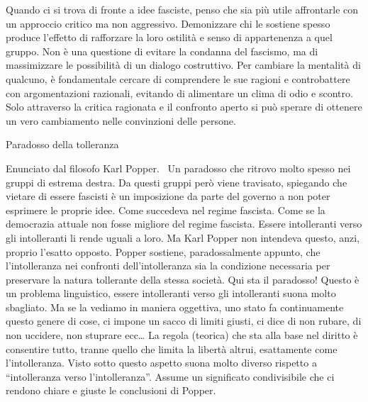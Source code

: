 \documentclass[12pt]{book} %
\begin{document}
\begin{mdframed}[linewidth=1pt]
Quando ci si trova di fronte a idee fasciste, penso che sia più utile affrontarle con un approccio critico ma non aggressivo. Demonizzare chi le sostiene spesso produce l'effetto di rafforzare la loro ostilità e senso di appartenenza a quel gruppo. Non è una questione di evitare la condanna del fascismo, ma di massimizzare le possibilità di un dialogo costruttivo. Per cambiare la mentalità di qualcuno, è fondamentale cercare di comprendere le sue ragioni e controbattere con argomentazioni razionali, evitando di alimentare un clima di odio e scontro. Solo attraverso la critica ragionata e il confronto aperto si può sperare di ottenere un vero cambiamento nelle convinzioni delle persone.
\end{mdframed}

\bigskip
\begin{mdframed}[linewidth=1pt]
Paradosso della tolleranza

Enunciato dal filosofo Karl Popper. \ Un paradosso che ritrovo molto spesso nei gruppi di estrema destra. Da questi
gruppi però viene travisato, spiegando che vietare di essere fascisti è un imposizione da parte del governo a non poter
esprimere le proprie idee. Come succedeva nel regime fascista. Come se la democrazia attuale non fosse migliore del
regime fascista. Essere intolleranti verso gli intolleranti li rende uguali a loro. Ma Karl Popper non intendeva
questo, anzi, proprio l'esatto opposto. Popper sostiene, paradossalmente appunto, che
l'intolleranza nei confronti dell'intolleranza sia la condizione necessaria per preservare la natura tollerante della
stessa società. Qui sta il paradosso! Questo è un problema linguistico, essere intolleranti verso gli intolleranti
suona molto sbagliato. Ma se la vediamo in maniera oggettiva, uno stato fa continuamente questo genere di cose, ci
impone un sacco di limiti giusti, ci dice di non rubare, di non uccidere, non stuprare ecc… La regola (teorica) che sta
alla base nel diritto è consentire tutto, tranne quello che limita la libertà altrui, esattamente come
l'intolleranza. Visto sotto questo aspetto suona molto diverso rispetto a “intolleranza verso
l'intolleranza”. Assume un significato condivisibile che ci rendono chiare e giuste le conclusioni
di Popper.
\end{mdframed}
\end{document}
